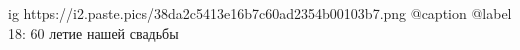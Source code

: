  
 
 
 
 

\ifcmt
	ig https://i2.paste.pics/38da2c5413e16b7c60ad2354b00103b7.png
  @caption @label 18: 60 летие нашей свадьбы
\fi
